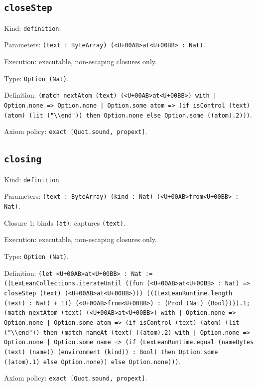 \documentclass[11pt]{article}
\begin{document}
\subsection*{\texttt{closeStep}}
\noindent Kind: \texttt{definition}.\par
\noindent Parameters: \texttt{(text : ByteArray) (<U+00AB>at<U+00BB> : Nat)}.\par
\noindent Execution: executable, non-escaping closures only.\par
\noindent Type: \texttt{Option (Nat)}.\par
\noindent Definition: \texttt{(match nextAtom (text) (<U+00AB>at<U+00BB>) with | Option.none => Option.none | Option.some atom => (if isControl (text) (atom) (lit ("\textbackslash{}\textbackslash{}end")) then Option.none else Option.some ((atom).2)))}.\par
\noindent Axiom policy: \texttt{exact [Quot.sound, propext]}.\par
\subsection*{\texttt{closing}}
\noindent Kind: \texttt{definition}.\par
\noindent Parameters: \texttt{(text : ByteArray) (kind : Nat) (<U+00AB>from<U+00BB> : Nat)}.\par
\noindent Closure 1: binds \texttt{(at)}, captures \texttt{(text)}.\par
\noindent Execution: executable, non-escaping closures only.\par
\noindent Type: \texttt{Option (Nat)}.\par
\noindent Definition: \texttt{(let <U+00AB>at<U+00BB> : Nat := ((LexLeanCollections.iterateUntil ((fun (<U+00AB>at<U+00BB> : Nat) => closeStep (text) (<U+00AB>at<U+00BB>))) (((LexLeanRuntime.length (text) : Nat) + 1)) (<U+00AB>from<U+00BB>) : (Prod (Nat) (Bool)))).1; (match nextAtom (text) (<U+00AB>at<U+00BB>) with | Option.none => Option.none | Option.some atom => (if isControl (text) (atom) (lit ("\textbackslash{}\textbackslash{}end")) then (match nameAt (text) ((atom).2) with | Option.none => Option.none | Option.some name => (if (LexLeanRuntime.equal (nameBytes (text) (name)) (environment (kind)) : Bool) then Option.some ((atom).1) else Option.none)) else Option.none)))}.\par
\noindent Axiom policy: \texttt{exact [Quot.sound, propext]}.\par
\end{document}
